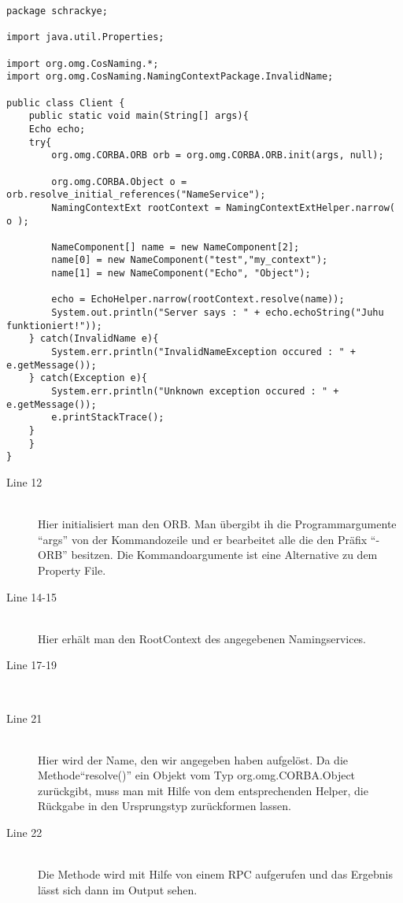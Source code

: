 \documentclass[11pt]{article}
\begin{document}
\begin{lstlisting}
package schrackye;

import java.util.Properties;

import org.omg.CosNaming.*;
import org.omg.CosNaming.NamingContextPackage.InvalidName;

public class Client {
    public static void main(String[] args){
	Echo echo;
	try{
	    org.omg.CORBA.ORB orb = org.omg.CORBA.ORB.init(args, null);

	    org.omg.CORBA.Object o = orb.resolve_initial_references("NameService");
	    NamingContextExt rootContext = NamingContextExtHelper.narrow( o );
			
	    NameComponent[] name = new NameComponent[2];
	    name[0] = new NameComponent("test","my_context");
	    name[1] = new NameComponent("Echo", "Object");
		
	    echo = EchoHelper.narrow(rootContext.resolve(name));
	    System.out.println("Server says : " + echo.echoString("Juhu funktioniert!"));
	} catch(InvalidName e){
	    System.err.println("InvalidNameException occured : " + e.getMessage());
	} catch(Exception e){
	    System.err.println("Unknown exception occured : " + e.getMessage());
	    e.printStackTrace();
	}
    }
}
\end{lstlisting}

\begin{description}
\item[Line 12] \hfill \\
Hier initialisiert man den ORB. Man übergibt ih die Programmargumente ``args'' von der Kommandozeile und er bearbeitet alle die den Präfix ``-ORB'' besitzen. Die Kommandoargumente ist eine Alternative zu dem Property File.

\item[Line 14-15] \hfill \\
Hier erhält man den RootContext des angegebenen Namingservices. 

\item[Line 17-19] \hfill \\

\item[Line 21] \hfill \\
Hier wird der Name, den wir angegeben haben aufgelöst. Da die Methode``resolve()'' ein Objekt vom Typ org.omg.CORBA.Object zurückgibt, muss man mit Hilfe von dem entsprechenden Helper, die Rückgabe in den Ursprungstyp zurückformen lassen.

\item[Line 22] \hfill \\
Die Methode wird mit Hilfe von einem RPC aufgerufen und das Ergebnis lässt sich dann im Output sehen.

\end{description}
\end{document}
